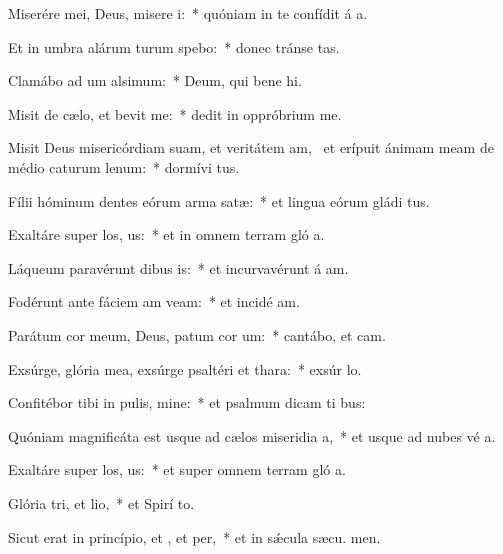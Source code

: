 \item Miserére mei, Deus, misere i:~* quóniam in te confídit á a.
\item Et in umbra alárum turum spebo:~* donec tránse tas.
\item Clamábo ad um alsimum:~* Deum, qui bene hi.
\item Misit de cælo, et bevit me:~* dedit in oppróbrium  me.
\item Misit Deus misericórdiam suam, et veritátem am,~\pscross{} et erípuit ánimam meam de médio caturum lenum:~* dormívi tus.
\item Fílii hóminum dentes eórum arma  satæ:~* et lingua eórum gládi tus.
\item Exaltáre super los, us:~* et in omnem terram gló a.
\item Láqueum paravérunt dibus is:~* et incurvavérunt á am.
\item Fodérunt ante fáciem am veam:~* et incidé  am.
\item Parátum cor meum, Deus, patum cor um:~* cantábo, et  cam.
\item Exsúrge, glória mea, exsúrge psaltéri et thara:~* exsúr lo.
\item Confitébor tibi in pulis, mine:~* et psalmum dicam ti  bus:
\item Quóniam magnificáta est usque ad cælos miseridia a,~* et usque ad nubes vé a.
\item Exaltáre super los, us:~* et super omnem terram gló a.
\item Glória tri, et lio,~* et Spirí to.
\item Sicut erat in princípio, et , et per,~* et in sǽcula sæcu. men.
